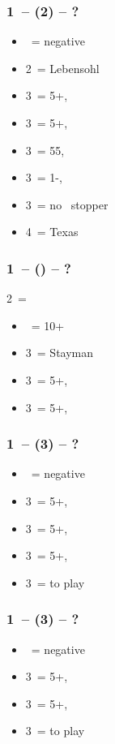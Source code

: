 \subsubsection*{1\ntx\ -- (2\spades) -- ?}
\begin{itemize}
    \item \dbl\ = negative
    \item 2\nt\ = Lebensohl
    \item 3\clubs\ = 5+\diams, \invp
    \item 3\diams\ = 5+\hearts, \invp
    \item 3\hearts\ = 55\minor, \gf
    \item 3\spades\ = 1-\spades, \invp
    \item 3\nt\ = no \spades\ stopper
    \item 4\diams\ = Texas
\end{itemize}

\subsubsection*{1\ntx\ -- (\alrts{2\nt}) -- ?}
2\nt\ = \minor
\begin{itemize}
    \item \dbl\ = 10+
    \item 3\clubs\ = Stayman
    \item 3\diams\ = 5+\hearts, \invp
    \item 3\hearts\ = 5+\spades, \invp
\end{itemize}

\subsubsection*{1\ntx\ -- (3\clubs) -- ?}
\begin{itemize}
    \item \dbl\ = negative
    \item 3\diams\ = 5+\hearts, \invp
    \item 3\hearts\ = 5+\spades, \invp
    \item 3\spades\ = 5+\diams, \invp
    \item 3\nt\ = to play
\end{itemize}

\subsubsection*{1\ntx\ -- (3\diams) -- ?}
\begin{itemize}
    \item \dbl\ = negative
    \item 3\hearts\ = 5+\spades, \invp
    \item 3\spades\ = 5+\hearts, \gf
    \item 3\nt\ = to play
\end{itemize}


